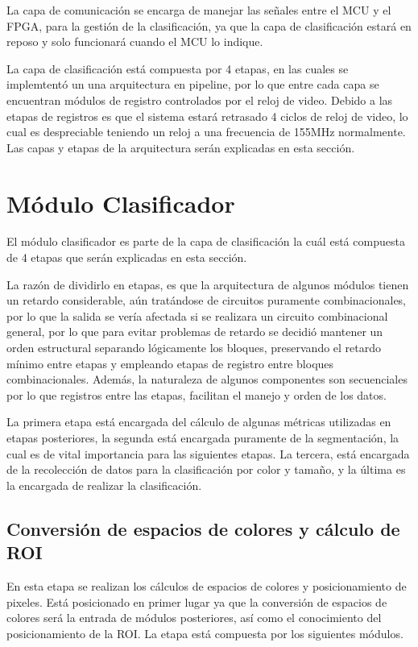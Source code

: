 \documentclass[twoside,spanish,ESP,MSc]{plantillaLabUPV}
\theoremstyle{definition}
\begin{document}
La capa de comunicación se encarga de manejar las señales entre el MCU y el FPGA, para la gestión de la clasificación, ya que la capa de clasificación estará en reposo y solo funcionará cuando el MCU lo indique.

La capa de clasificación está compuesta por 4 etapas, en las cuales se implemtentó un  una arquitectura en pipeline, por lo que entre cada capa se encuentran módulos de registro controlados por el reloj de video. Debido a las etapas de registros es que el sistema estará retrasado 4 ciclos de reloj de video, lo cual es despreciable teniendo un reloj a una frecuencia de 155MHz normalmente. Las capas y etapas de la arquitectura serán explicadas en esta sección.

\section{Módulo Clasificador} \label{clasificador}

El módulo clasificador es parte de la capa de clasificación la cuál está compuesta de 4 etapas que serán explicadas en esta sección. 

La razón de dividirlo en etapas, es que la arquitectura de algunos módulos tienen un retardo considerable, aún tratándose de circuitos puramente combinacionales, por lo que la salida se vería afectada si se realizara un circuito combinacional general, por lo que para evitar problemas de retardo se decidió mantener un orden estructural separando lógicamente los bloques, preservando el retardo mínimo entre etapas y empleando etapas de registro entre bloques combinacionales. Además, la naturaleza de algunos componentes son secuenciales por lo que registros entre las etapas, facilitan el manejo y orden de los datos.

La primera etapa está encargada del cálculo de algunas métricas utilizadas en etapas posteriores, la segunda está encargada puramente de la segmentación, la cual es de vital importancia para las siguientes etapas. La tercera, está encargada de la recolección de datos para la clasificación por color y tamaño, y la última es la encargada de realizar la clasificación.

\subsection{Conversión de espacios de colores y cálculo de ROI}
En esta etapa se realizan los cálculos de espacios de colores y posicionamiento de pixeles. Está posicionado en primer lugar ya que la conversión de espacios de colores será la entrada de módulos posteriores, así como el conocimiento del posicionamiento de la ROI. La etapa está compuesta por los siguientes módulos.
\end{document}
